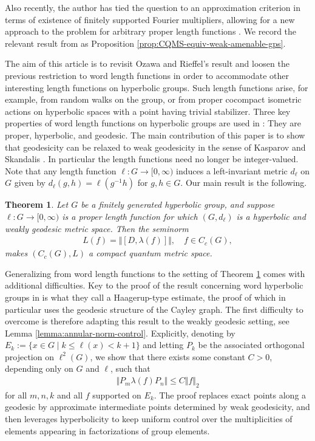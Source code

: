 \documentclass[12pt,a4paper,oneside,final,reqno]{amsart}
\theoremstyle{plain}
\newtheorem{introtheorem}{Theorem}
\theoremstyle{definition}
\begin{document}
Also recently, the author has tied the question to an approximation criterion in terms of existence of finitely supported Fourier multipliers, allowing for a new approach to the problem for arbitrary proper length functions \cite{AustadGpdCQMS}. 
We record the relevant result from \cite{AustadGpdCQMS} as
Proposition \ref{prop:CQMS-equiv-weak-amenable-gps}. 

The aim of this article is to revisit Ozawa and Rieffel's result and loosen the previous restriction to word length functions in order to accommodate other interesting length functions on hyperbolic groups. Such length functions arise, for example, from random walks on the group, or from proper cocompact isometric actions on hyperbolic spaces with a point having trivial stabilizer. Three key properties of word length functions on hyperbolic groups are used in \cite{OzawaRieffel2005}: They are proper, hyperbolic, and geodesic. The main contribution of this paper is to show that geodesicity can be relaxed to weak geodesicity in the sense of Kasparov and Skandalis \cite{KasparovSkandalis2003}. In particular the length functions need no longer be integer-valued. 
Note that any length function $\ell \colon G \to [0,\infty)$ induces a left-invariant metric $d_\ell$ on $G$ given by $d_\ell(g, h) = \ell(g^{-1}h)$ for $g,h\in G$. 
Our main result is the following. 

\begin{introtheorem}\label{introthm:main-theorem}
    Let $G$ be a finitely generated hyperbolic group, and suppose $\ell\colon G \to [0,\infty)$ is a proper length function for which $(G,d_\ell)$ is a hyperbolic and weakly geodesic metric space. Then the seminorm
    \begin{align*}
        L(f) = \Vert [D, \lambda(f)]\Vert , \quad f\in C_c(G),
    \end{align*}
    makes $(C_c(G), L)$ a compact quantum metric space. 
\end{introtheorem}

Generalizing from word length functions to the setting of Theorem \ref{introthm:main-theorem} comes with additional difficulties. Key to the proof of the result concerning word hyperbolic groups in \cite{OzawaRieffel2005} is what they call a Haagerup-type estimate, the proof of which in particular uses the geodesic structure of the Cayley graph. The first difficulty to overcome is therefore adapting this result to the weakly geodesic setting, see Lemma \ref{lemma:annular-norm-control}. Explicitly, denoting by $E_k := \{x \in G \mid k \leq \ell(x) < k+1\}$ and letting $P_k$ be the associated orthogonal projection on $\ell^2(G)$, we show that there exists some constant $C >0$, depending only on 
$G$ and $\ell$, 
such that
\begin{align*}
    \Vert P_m \lambda(f) P_n \Vert \leq C \Vert f \Vert_2
\end{align*}
for all $m,n,k$ and all $f$ supported on $E_k$. 
The proof replaces exact points along a geodesic by approximate intermediate points determined by weak geodesicity, and then leverages hyperbolicity to keep uniform control over the multiplicities of elements appearing in factorizations of group elements. 
\end{document}
